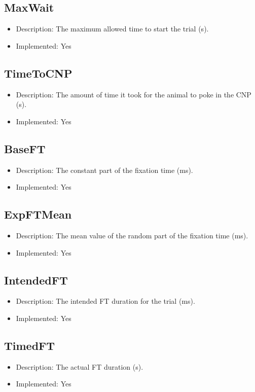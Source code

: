 \subsection*{MaxWait}
\begin{itemize}
	\item Description: The maximum allowed time to start the trial (s).
	\item Implemented: Yes
\end{itemize}

\subsection*{TimeToCNP}
\begin{itemize}
	\item Description: The amount of time it took for the animal to poke in the CNP (s).
	\item Implemented: Yes
\end{itemize}

\subsection*{BaseFT}
\begin{itemize}
	\item Description: The constant part of the fixation time (ms).
	\item Implemented: Yes
\end{itemize}

\subsection*{ExpFTMean}
\begin{itemize}
	\item Description: The mean value of the random part of the fixation time (ms).
	\item Implemented: Yes
\end{itemize}

\subsection*{IntendedFT}
\begin{itemize}
	\item Description: The intended FT duration for the trial (ms).
	\item Implemented: Yes
\end{itemize}

\subsection*{TimedFT}
\begin{itemize}
	\item Description: The actual FT duration (s).
	\item Implemented: Yes
\end{itemize}

